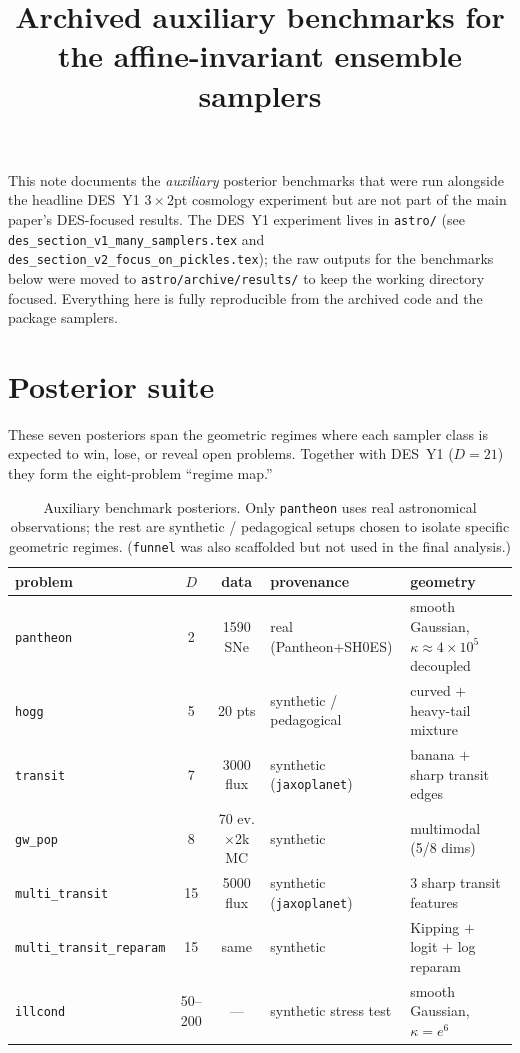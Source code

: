 \documentclass[11pt]{article}
\title{Archived auxiliary benchmarks for the affine-invariant ensemble samplers}
\author{}
\date{}
\begin{document}
\maketitle

\noindent
This note documents the \emph{auxiliary} posterior benchmarks that were run
alongside the headline DES~Y1 $3\times2$pt cosmology experiment but are not
part of the main paper's DES-focused results.  The DES~Y1 experiment lives in
\texttt{astro/} (see \texttt{des\_section\_v1\_many\_samplers.tex} and
\texttt{des\_section\_v2\_focus\_on\_pickles.tex}); the raw outputs for the
benchmarks below were moved to \texttt{astro/archive/results/} to keep the
working directory focused.  Everything here is fully reproducible from the
archived code and the package samplers.

\section{Posterior suite}

These seven posteriors span the geometric regimes where each sampler class is
expected to win, lose, or reveal open problems.  Together with DES~Y1 ($D=21$)
they form the eight-problem ``regime map.''

\begin{table}[h]
\centering
\small
\begin{tabular}{l c c l l}
\toprule
problem & $D$ & data & provenance & geometry \\
\midrule
\texttt{pantheon}              & 2     & 1590 SNe        & real (Pantheon+SH0ES)        & smooth Gaussian, $\kappa\!\approx\!4\times10^5$ decoupled \\
\texttt{hogg}                  & 5     & 20 pts          & synthetic / pedagogical      & curved $+$ heavy-tail mixture \\
\texttt{transit}               & 7     & 3000 flux       & synthetic (\texttt{jaxoplanet}) & banana $+$ sharp transit edges \\
\texttt{gw\_pop}               & 8     & 70 ev.$\times$2k MC & synthetic                & multimodal (5/8 dims) \\
\texttt{multi\_transit}        & 15    & 5000 flux       & synthetic (\texttt{jaxoplanet}) & 3 sharp transit features \\
\texttt{multi\_transit\_reparam} & 15  & same            & synthetic                    & Kipping $+$ logit $+$ log reparam \\
\texttt{illcond}               & 50--200 & ---           & synthetic stress test        & smooth Gaussian, $\kappa=e^6$ \\
\bottomrule
\end{tabular}
\caption{Auxiliary benchmark posteriors. Only \texttt{pantheon} uses real
astronomical observations; the rest are synthetic / pedagogical setups chosen
to isolate specific geometric regimes. (\texttt{funnel} was also scaffolded
but not used in the final analysis.)}
\end{table}
\end{document}
